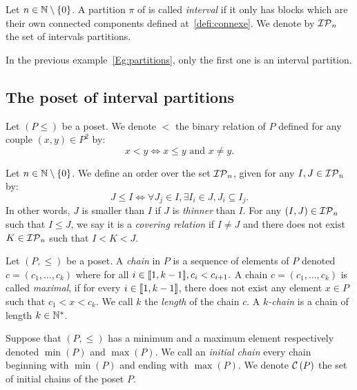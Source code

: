 \begin{defi}
	Let $n\in\mathbb{N}\setminus\{0\}$.
	A partition $\pi$ of  is called \emph{interval} if it only has blocks which are their own connected components defined at~\ref{defi:connexe}. 
	We denote by $\mathcal{IP}_{n}$ the set of intervals partitions.
\end{defi}

In the previous example~\eqref{Eg:partitions}, only the first one is an interval partition.

\subsection{The poset of interval partitions}

\begin{Not}
	Let $(P\leq)$ be a poset. We denote $<$ the binary relation of $P$ defined for any couple $(x,y)\in P^2$ by:
	\[
	x<y\iff x\leq y \text{ and }x\neq y.
	\]
\end{Not}

\begin{defi}
	Let $n\in\mathbb{N}\setminus\{0\}$.
	We define an order over the set $\mathcal{IP}_{n}$, given for any $I,J\in\mathcal{IP}_{n}$ by:
	\[
	J\leq I \iff \forall J_j\in I, \exists I_i\in J, J_i\subseteq I_j.
	\]
	In other words, $J$ is smaller than $I$ if $J$ is \emph{thinner} than $I$.
	For any $(I,J)\in\mathcal{IP}_{n}$ such that $I\leq J$, we say it is a \emph{covering relation} if $I\neq J$ and there does not exist $K\in\mathcal{IP}_{n}$ such that $I< K< J.$ 
\end{defi}

\begin{defi}
	Let $(P,\leq)$ be a poset. A \emph{chain} in $P$ is a sequence of elements of $P$ denoted $c=(c_1,\dots,c_k)$ where for all $i\in\llbracket 1,k-1 \rrbracket, c_i<c_{i+1}.$
	A chain $c=(c_1,\dots,c_k)$ is called \emph{maximal}, if for every $i\in\llbracket 1,k-1 \rrbracket$, there does not exist any element $x\in P$ such that $c_1< x<c_k$.
	We call $k$ the \emph{length} of the chain $c$. A \emph{$k$-chain} is a chain of length $k\in\mathbb{N}^*$.
	
	Suppose that $(P,\leq)$ has a minimum and a maximum element respectively denoted $\min(P)$ and $\max(P)$.
	We call an \emph{initial chain} every chain beginning with $\min(P)$ and ending with $\max(P).$ 
	We denote $\mathcal{C}\left(P\right)$ the set of initial chains of the poset $P$.
\end{defi}

